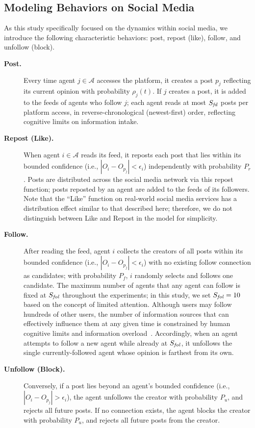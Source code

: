 \documentclass[pdflatex,sn-mathphys-num]{sn-jnl}%
\theoremstyle{thmstyleone}%
\theoremstyle{thmstyletwo}%
\theoremstyle{thmstylethree}%
\def\AgentSet{\mathcal{A}}
\def\post{\rho} %
\def\BoundedConfidence{\epsilon}
\def\maxfollower{S_{\it fol}}
\def\maxfeed{S_{\it fd}}
\begin{document}
\subsection{Modeling Behaviors on Social Media}
As this study specifically focused on the dynamics within social
media, we introduce the following characteristic behaviors:
post, repost (like), follow, and unfollow (block).

\begin{description}
\item[{\bf Post.}] Every time agent $j\in\AgentSet$ accesses the
  platform, it creates a post $p_j$ reflecting its current opinion
  with probability $\post_j(t)$. If $j$ creates a post, it is added to
  the feeds of agents who follow $j$; each agent reads at most $\maxfeed$ posts per platform access, in reverse-chronological (newest-first) order, reflecting cognitive limits on information intake.

\item[{\bf Repost (Like).}] When agent $i\in\AgentSet$ reads its
  feed, it reposts each post that lies within its bounded confidence
  (i.e., $|O_i - O_{p_j}| <
  \BoundedConfidence_i$) independently with probability $P_r$. Posts are distributed across the social
  media network via this repost function; posts reposted by an agent
  are added to the feeds of its followers. Note that the ``Like''
  function on real-world social media services has a distribution effect
  similar to that described here; therefore, we do not distinguish
  between Like and Repost in the model for simplicity.

\item[{\bf Follow.}] After reading the feed, agent $i$ collects the creators of all posts within its bounded confidence (i.e., $|O_i - O_{p_j}| < \BoundedConfidence_i$) with no existing follow connection as candidates; with probability $P_f$, $i$ randomly selects and follows one candidate.
The maximum number of agents that any agent can follow is fixed at $\maxfollower$ throughout the experiments; in this study, we set $\maxfollower=10$ based on the concept of limited attention.
Although users may follow hundreds of other users, the number
of information sources that can effectively influence them
at any given time is constrained by human cognitive limits
and information overload~\cite{Goncalves2011,Weng2012}.
Accordingly, when an agent attempts to follow a new agent while already at $\maxfollower$, it unfollows the single currently-followed agent whose opinion is farthest from its own.

\item[{\bf Unfollow (Block).}] Conversely, if a post lies beyond an agent's bounded confidence (i.e., $|O_i - O_{p_j}| > \BoundedConfidence_i$), the agent unfollows the creator with probability $P_u$, and rejects all future posts. If no connection exists, the agent blocks the creator with probability $P_u$, and rejects all future posts from the creator.
\end{description}
\par
\end{document}

